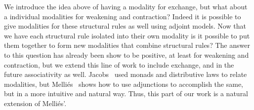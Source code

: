 We introduce the idea above of having a modality for exchange, but
what about a individual modalities for weakening and contraction?
Indeed it is possible to give modalities for these structural rules as
well using adjoint models.  Now that we have each structural rule
isolated into their own modality is it possible to put them together
to form new modalities that combine structural rules?  The answer to
this question has already been show to be positive, at least for
weakening and contraction, but we extend this line of work to include
exchange, and in the future associativity as well.
Jacobs~\cite{JACOBS199473} used monads and distributive laws to relate
modalities, but Melli{\'e}s~\cite{Mellies:2004} shows how to use
adjunctions to accomplish the same, but in a more intuitive and
natural way.  Thus, this part of our work is a natural extension of
Melli{\'e}s'.
